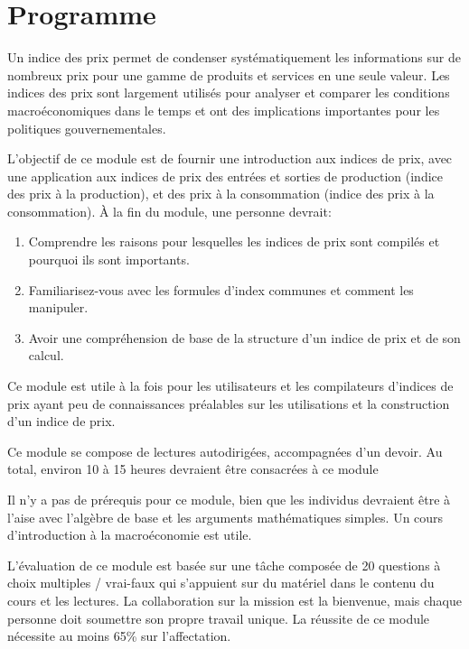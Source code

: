 \documentclass[]{article}
\begin{document}
\hypertarget{programme}{%
\section{Programme}\label{programme}}

Un indice des prix permet de condenser systématiquement les informations sur de nombreux prix pour une gamme de produits et services en une seule valeur. Les indices des prix sont largement utilisés pour analyser et comparer les conditions macroéconomiques dans le temps et ont des implications importantes pour les politiques gouvernementales.

L'objectif de ce module est de fournir une introduction aux indices de prix, avec une application aux indices de prix des entrées et sorties de production (indice des prix à la production), et des prix à la consommation (indice des prix à la consommation). À la fin du module, une personne devrait:

\begin{enumerate}
\def\labelenumi{\arabic{enumi}.}
\item
  Comprendre les raisons pour lesquelles les indices de prix sont compilés et pourquoi ils sont importants.
\item
  Familiarisez-vous avec les formules d'index communes et comment les manipuler.
\item
  Avoir une compréhension de base de la structure d'un indice de prix et de son calcul.
\end{enumerate}

Ce module est utile à la fois pour les utilisateurs et les compilateurs d'indices de prix ayant peu de connaissances préalables sur les utilisations et la construction d'un indice de prix.

Ce module se compose de lectures autodirigées, accompagnées d'un devoir. Au total, environ 10 à 15 heures devraient être consacrées à ce module

Il n'y a pas de prérequis pour ce module, bien que les individus devraient être à l'aise avec l'algèbre de base et les arguments mathématiques simples. Un cours d'introduction à la macroéconomie est utile.

L'évaluation de ce module est basée sur une tâche composée de 20 questions à choix multiples / vrai-faux qui s'appuient sur du matériel dans le contenu du cours et les lectures. La collaboration sur la mission est la bienvenue, mais chaque personne doit soumettre son propre travail unique. La réussite de ce module nécessite au moins 65\% sur l'affectation.
\end{document}

